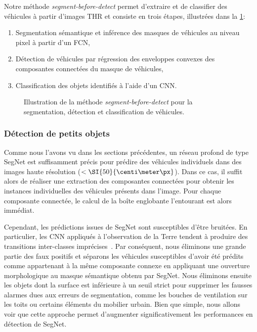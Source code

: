 Notre méthode \emph{segment-before-detect} permet d'extraire et de classifier des véhicules à partir d'images \gls{THR} et consiste en trois étapes, illustrées dans la \cref{fig:pipeline}:
\begin{enumerate}
\item Segmentation sémantique et inférence des masques de véhicules au niveau pixel à partir d'un \gls{FCN},
\item Détection de véhicules par régression des enveloppes convexes des composantes connectées du masque de véhicules,
\item Classification des objets identifiés à l'aide d'un \gls{CNN}.
\end{enumerate}

\begin{figure}[t]
  \resizebox{\textwidth}{!}{%
  	
  }
  \caption{Illustration de la méthode \emph{segment-before-detect} pour la segmentation, détection et classification de véhicules.}
  \label{fig:pipeline}
\end{figure}

\subsubsection{Détection de petits objets}

Comme nous l'avons vu dans les sections précédentes, un réseau profond de type SegNet est suffisamment précis pour prédire des véhicules individuels dans des images haute résolution ($<\SI{50}{\centi\meter\px}$). Dans ce cas, il suffit alors de réaliser une extraction des composantes connectées pour obtenir les instances individuelles des véhicules présents dans l'image. Pour chaque composante connectée, le calcul de la boîte englobante l'entourant est alors immédiat.

Cependant, les prédictions issues de SegNet sont susceptibles d'être bruitées. En particulier, les \gls{CNN} appliqués à l'observation de la Terre tendent à produire des transitions inter-classes imprécises~\cite{marmanis_classification_2017}. Par conséquent, nous éliminons une grande partie des faux positifs et séparons les véhicules susceptibles d'avoir été prédits comme appartenant à la même composante connexe en appliquant une ouverture morphologique au masque sémantique obtenu par SegNet. Nous éliminons ensuite les objets dont la surface est inférieure à un seuil strict pour supprimer les fausses alarmes dues aux erreurs de segmentation, comme les bouches de ventilation sur les toits ou certains éléments du mobilier urbain. Bien que simple, nous allons voir que cette approche permet d'augmenter significativement les performances en détection de SegNet.


